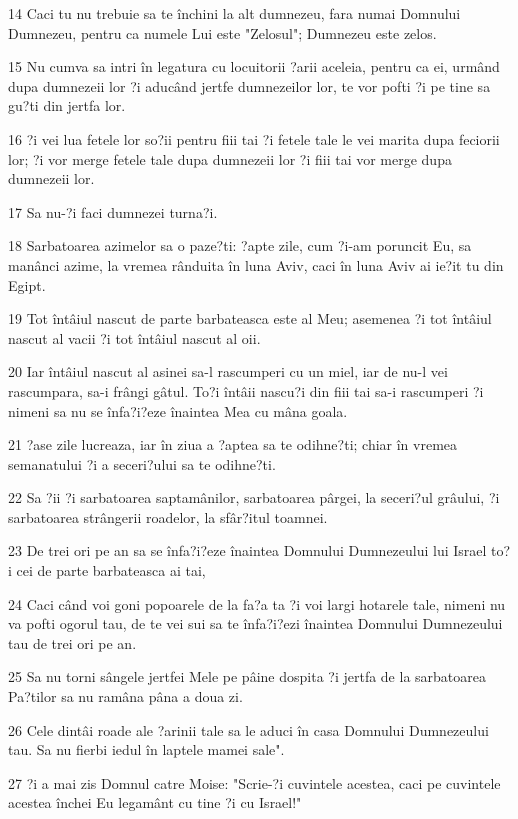 \par 14 Caci tu nu trebuie sa te închini la alt dumnezeu, fara numai Domnului Dumnezeu, pentru ca numele Lui este "Zelosul"; Dumnezeu este zelos.
\par 15 Nu cumva sa intri în legatura cu locuitorii ?arii aceleia, pentru ca ei, urmând dupa dumnezeii lor ?i aducând jertfe dumnezeilor lor, te vor pofti ?i pe tine sa gu?ti din jertfa lor.
\par 16 ?i vei lua fetele lor so?ii pentru fiii tai ?i fetele tale le vei marita dupa feciorii lor; ?i vor merge fetele tale dupa dumnezeii lor ?i fiii tai vor merge dupa dumnezeii lor.
\par 17 Sa nu-?i faci dumnezei turna?i.
\par 18 Sarbatoarea azimelor sa o paze?ti: ?apte zile, cum ?i-am poruncit Eu, sa manânci azime, la vremea rânduita în luna Aviv, caci în luna Aviv ai ie?it tu din Egipt.
\par 19 Tot întâiul nascut de parte barbateasca este al Meu; asemenea ?i tot întâiul nascut al vacii ?i tot întâiul nascut al oii.
\par 20 Iar întâiul nascut al asinei sa-l rascumperi cu un miel, iar de nu-l vei rascumpara, sa-i frângi gâtul. To?i întâii nascu?i din fiii tai sa-i rascumperi ?i nimeni sa nu se înfa?i?eze înaintea Mea cu mâna goala.
\par 21 ?ase zile lucreaza, iar în ziua a ?aptea sa te odihne?ti; chiar în vremea semanatului ?i a seceri?ului sa te odihne?ti.
\par 22 Sa ?ii ?i sarbatoarea saptamânilor, sarbatoarea pârgei, la seceri?ul grâului, ?i sarbatoarea strângerii roadelor, la sfâr?itul toamnei.
\par 23 De trei ori pe an sa se înfa?i?eze înaintea Domnului Dumnezeului lui Israel to?i cei de parte barbateasca ai tai,
\par 24 Caci când voi goni popoarele de la fa?a ta ?i voi largi hotarele tale, nimeni nu va pofti ogorul tau, de te vei sui sa te înfa?i?ezi înaintea Domnului Dumnezeului tau de trei ori pe an.
\par 25 Sa nu torni sângele jertfei Mele pe pâine dospita ?i jertfa de la sarbatoarea Pa?tilor sa nu ramâna pâna a doua zi.
\par 26 Cele dintâi roade ale ?arinii tale sa le aduci în casa Domnului Dumnezeului tau. Sa nu fierbi iedul în laptele mamei sale".
\par 27 ?i a mai zis Domnul catre Moise: "Scrie-?i cuvintele acestea, caci pe cuvintele acestea închei Eu legamânt cu tine ?i cu Israel!"
